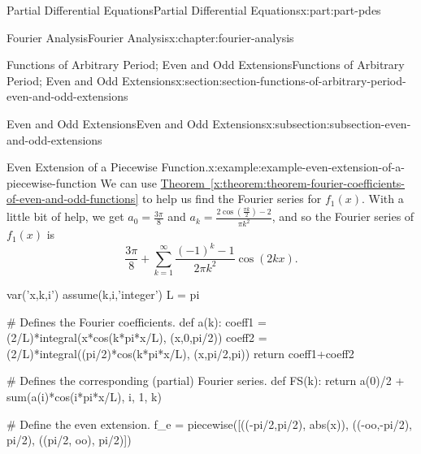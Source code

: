 \documentclass[twoside,10pt,]{book}
\newcommand{\xreffont}{\relax}
\numberwithin{equation}{part}
\begin{document}
\begin{partptx}{Partial Differential Equations}{}{Partial Differential Equations}{}{}{x:part:part-pdes}
\begin{chapterptx}{Fourier Analysis}{}{Fourier Analysis}{}{}{x:chapter:fourier-analysis}
\begin{sectionptx}{Functions of Arbitrary Period; Even and Odd Extensions}{}{Functions of Arbitrary Period; Even and Odd Extensions}{}{}{x:section:section-functions-of-arbitrary-period-even-and-odd-extensions}
\begin{subsectionptx}{Even and Odd Extensions}{}{Even and Odd Extensions}{}{}{x:subsection:subsection-even-and-odd-extensions}
\begin{example}{Even Extension of a Piecewise Function.}{x:example:example-even-extension-of-a-piecewise-function}
We can use \hyperref[x:theorem:theorem-fourier-coefficients-of-even-and-odd-functions]{Theorem~{\xreffont\ref{x:theorem:theorem-fourier-coefficients-of-even-and-odd-functions}}} to help us find the Fourier series for \(f_{1}(x)\). With a little bit of help, we get \(a_{0} = \frac{3\pi}{8}\) and \(a_{k} = \frac{2\cos(\frac{\pi k}{2})-2}{\pi k^{2}}\), and so the Fourier series of \(f_{1}(x)\) is%
\begin{equation*}
\frac{3\pi}{8}+\sum_{k=1}^{\infty}\frac{(-1)^{k}-1}{2\pi k^{2}}\cos(2kx).
\end{equation*}
%
\end{example}
\begin{sageinput}
var('x,k,i')
assume(k,i,'integer')
L = pi

# Defines the Fourier coefficients.
def a(k):
  coeff1 = (2/L)*integral(x*cos(k*pi*x/L), (x,0,pi/2))
  coeff2 = (2/L)*integral((pi/2)*cos(k*pi*x/L), (x,pi/2,pi))
  return coeff1+coeff2

# Defines the corresponding (partial) Fourier series.
def FS(k):
  return a(0)/2 + sum(a(i)*cos(i*pi*x/L), i, 1, k)

# Define the even extension.
f_e = piecewise([((-pi/2,pi/2), abs(x)), ((-oo,-pi/2), pi/2), ((pi/2, oo), pi/2)])


\end{sageinput}
\end{subsectionptx}
\end{sectionptx}
\end{chapterptx}
\end{partptx}
\end{document}
